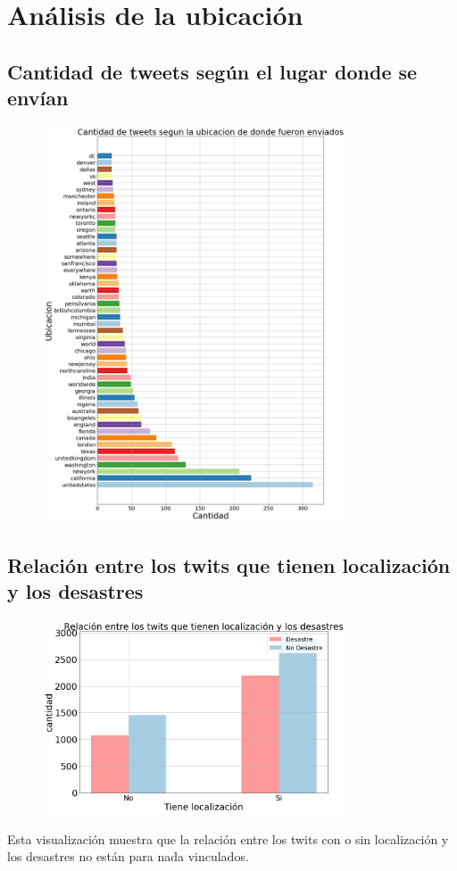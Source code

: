 \documentclass[titlepage,a4paper]{article}
\begin{document}
\section{\Large Análisis de la ubicación}
\subsection{\Large Cantidad de tweets según el lugar donde se envían}
{\Large
\begin{figure}[H]
 \centering
 \includegraphics[width=0.8\textwidth, height=0.8\textheight, keepaspectratio]{graficos/cantidad_de_tweets_segun_la_ubicacion_0.png}
\end{figure}
\par}
\subsection{\Large Relación entre los twits que tienen localización y los desastres}
{\Large
\begin{figure}[H]
 \centering
 \includegraphics[width=0.8\textwidth, height=0.8\textheight, keepaspectratio]{graficos/relacion_localizacion.png}
\end{figure}
Esta visualización muestra que la relación entre los twits con o sin localización y los desastres no están para nada vinculados.
\par}
\newpage
\end{document}
